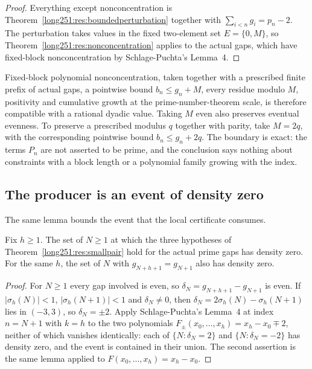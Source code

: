 \documentclass[11pt]{article}
\begin{document}
\begin{proof}
Everything except nonconcentration is Theorem~\ref{long251:res:boundedperturbation}
together with $\sum_{i<n}g_i=p_n-2$.  The perturbation takes values in the
fixed two-element set $E=\{0,M\}$, so Theorem~\ref{long251:res:nonconcentration}
applies to the actual gaps, which have fixed-block nonconcentration by
Schlage-Puchta's Lemma~4.
\end{proof}

Fixed-block polynomial nonconcentration, taken together with a prescribed
finite prefix of actual gaps, a pointwise bound $b_n\le g_n+M$, every residue
modulo $M$, positivity and cumulative growth at the prime-number-theorem scale,
is therefore compatible with a rational dyadic value.  Taking $M$ even also
preserves eventual evenness.  To preserve a prescribed modulus $q$ together
with parity, take $M=2q$, with the corresponding pointwise bound
$b_n\le g_n+2q$.  The boundary is exact: the terms $P_n$ are not asserted to be prime,
and the conclusion says nothing about constraints with a block length or a
polynomial family growing with the index.

\subsection{The producer is an event of density zero}

The same lemma bounds the event that the local certificate consumes.

\begin{theorem}\label{long251:res:sparse}
Fix $h\ge1$.  The set of $N\ge1$ at which the three hypotheses of
Theorem~\ref{long251:res:smallpair} hold for the actual prime gaps has density zero.
For the same $h$, the set of $N$ with $g_{N+h+1}=g_{N+1}$ also has density
zero.
\end{theorem}

\begin{proof}
For $N\ge1$ every gap involved is even, so $\delta_N=g_{N+h+1}-g_{N+1}$ is
even.  If $|\sigma_h(N)|<1$, $|\sigma_h(N+1)|<1$ and $\delta_N\ne0$, then
$\delta_N=2\sigma_h(N)-\sigma_h(N+1)$ lies in $(-3,3)$, so $\delta_N=\pm2$.
Apply Schlage-Puchta's Lemma~4 at index $n=N+1$ with $k=h$ to the two
polynomials $F_\pm(x_0,\ldots,x_h)=x_h-x_0\mp2$, neither of which vanishes
identically: each of $\{N:\delta_N=2\}$ and $\{N:\delta_N=-2\}$ has density
zero, and the event is contained in their union.  The second assertion is the
same lemma applied to $F(x_0,\ldots,x_h)=x_h-x_0$.
\end{proof}
\end{document}
